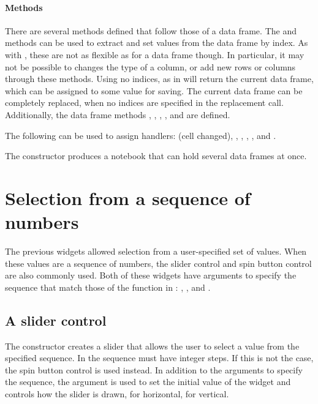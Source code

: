 \paragraph{Methods} There are several methods defined that follow
those of a data frame. The \method{[}{gdf} and \method{[\ASSIGN}{gdf}
methods can be used to extract and set values from the data frame by
index. As with , these are not as flexible as for a data
frame though. In particular, it may not be possible to changes the
type of a column, or add new rows or columns through these
methods. Using no indices, as in  will return the current
data frame, which can be assigned to some value for saving. The
current data frame can be completely replaced, when no indices are
specified in the replacement call. Additionally, the data frame
methods , ,
, , and
 are defined.

The following can be used to assign handlers:
 (cell changed),
, ,
,
, and
.


The  constructor produces a notebook that can hold several data frames at once.

\section{Selection from a sequence of numbers}
\label{sec:gWidgets-select-from-sequ}

The previous widgets allowed selection from a user-specified set of
values. When these values are a sequence of numbers, the slider
control and spin button control are also commonly used. Both of these
widgets have arguments to specify the sequence that match those of the
 function in \R: ,
, and .

\subsection{A slider control}
\label{sec:gWidgets-slider-control}

The  constructor creates a slider that allows the
user to select a value from the specified sequence.  In
 the sequence must have integer steps. If this is
not the case, the spin button control is used instead. In addition to
the arguments to specify the sequence, the argument
 is used to set the initial value of the
widget and  controls how the slider is
drawn,  for horizontal,  for vertical.

